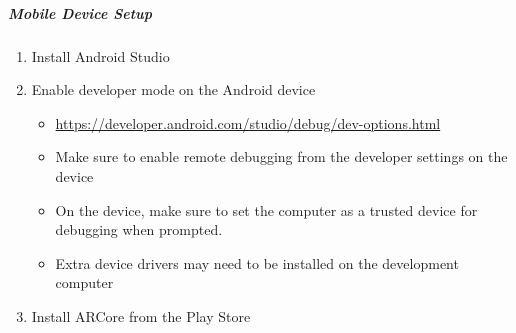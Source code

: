 \subparagraph{Mobile Device Setup}
\begin{enumerate}
    \item Install Android Studio
    \item Enable developer mode on the Android device
    \begin{itemize}
        \item \url{https://developer.android.com/studio/debug/dev-options.html}
        \item Make sure to enable remote debugging from the developer settings on the device
        \item On the device, make sure to set the computer as a trusted device for debugging when prompted.
        \item Extra device drivers may need to be installed on the development computer
    \end{itemize}

    \item Install ARCore from the Play Store
\end{enumerate}